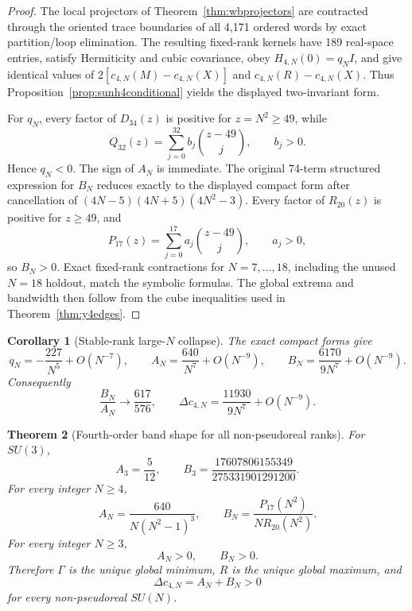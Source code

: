 \documentclass[11pt]{article}
\newtheorem{theorem}{Theorem}[section]
\newtheorem{corollary}[theorem]{Corollary}
\begin{document}
\begin{proof}
The local projectors of Theorem~\ref{thm:wbprojectors} are contracted through
the oriented trace boundaries of all 4,171 ordered words by exact
partition/loop elimination. The resulting fixed-rank kernels have 189
real-space entries, satisfy Hermiticity and cubic covariance, obey
$H_{4,N}(0)=q_NI$, and give identical values of
$2[c_{4,N}(M)-c_{4,N}(X)]$ and $c_{4,N}(R)-c_{4,N}(X)$. Thus
Proposition~\ref{prop:sunh4conditional} yields the displayed two-invariant
form.

For $q_N$, every factor of $D_{34}(z)$ is positive for $z=N^2\geq49$, while
\[
Q_{32}(z)=\sum_{j=0}^{32}b_j\binom{z-49}{j},\qquad b_j>0.
\]
Hence $q_N<0$. The sign of $A_N$ is immediate. The original 74-term
structured expression for $B_N$ reduces exactly to the displayed compact
form after cancellation of
$(4N-5)(4N+5)(4N^2-3)$. Every factor of $R_{20}(z)$ is positive for
$z\geq49$, and
\[
P_{17}(z)=\sum_{j=0}^{17}a_j\binom{z-49}{j},\qquad a_j>0,
\]
so $B_N>0$. Exact fixed-rank contractions for $N=7,\ldots,18$, including the
unused $N=18$ holdout, match the symbolic formulas. The global extrema and
bandwidth then follow from the cube inequalities used in
Theorem~\ref{thm:y4edges}.
\end{proof}

\begin{corollary}[Stable-rank large-$N$ collapse]
\label{cor:sunlargeN}
The exact compact forms give
\[
q_N=-\frac{227}{N^5}+O(N^{-7}),\qquad
A_N=\frac{640}{N^7}+O(N^{-9}),\qquad
B_N=\frac{6170}{9N^7}+O(N^{-9}).
\]
Consequently
\[
\frac{B_N}{A_N}\longrightarrow\frac{617}{576},\qquad
\Delta c_{4,N}=\frac{11930}{9N^7}+O(N^{-9}).
\]
\end{corollary}

\begin{theorem}[Fourth-order band shape for all non-pseudoreal ranks]
\label{thm:sunallband}
For $SU(3)$,
\[
A_3=\frac5{12},\qquad
B_3=\frac{17607806155349}{275331901291200}.
\]
For every integer $N\geq4$,
\[
A_N=\frac{640}{N(N^2-1)^3},\qquad
B_N=\frac{P_{17}(N^2)}{N R_{20}(N^2)}.
\]
For every integer $N\geq3$,
\[
A_N>0,\qquad B_N>0.
\]
Therefore $\Gamma$ is the unique global minimum, $R$ is the unique global
maximum, and
\[
\boxed{\Delta c_{4,N}=A_N+B_N>0}
\]
for every non-pseudoreal $SU(N)$.
\end{theorem}
\end{document}

